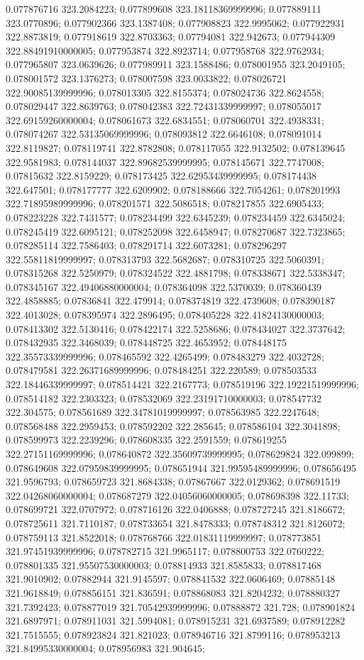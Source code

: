 0.077876716 323.2084223; 0.077899608 323.18118369999996; 0.077889111 323.0770896; 0.077902366 323.1387408; 0.077908823 322.9995062; 0.077922931 322.8873819; 0.077918619 322.8703363; 0.07794081 322.942673; 0.077944309 322.88491910000005; 0.077953874 322.8923714; 0.077958768 322.9762934; 0.077965807 323.0639626; 0.077989911 323.1588486; 0.078001955 323.2049105; 0.078001572 323.1376273; 0.078007598 323.0033822; 0.078026721 322.90085139999996; 0.078013305 322.8155374; 0.078024736 322.8624558; 0.078029447 322.8639763; 0.078042383 322.72431339999997; 0.078055017 322.69159260000004; 0.078061673 322.6834551; 0.078060701 322.4938331; 0.078074267 322.53135069999996; 0.078093812 322.6646108; 0.078091014 322.8119827; 0.078119741 322.8782808; 0.078117055 322.9132502; 0.078139645 322.9581983; 0.078144037 322.89682539999995; 0.078145671 322.7747008; 0.07815632 322.8159229; 0.078173425 322.62953439999995; 0.078174438 322.647501; 0.078177777 322.6209902; 0.078188666 322.7054261; 0.078201993 322.71895989999996; 0.078201571 322.5086518; 0.078217855 322.6905433; 0.078223228 322.7431577; 0.078234499 322.6345239; 0.078234459 322.6345024; 0.078245419 322.6095121; 0.078252098 322.6458947; 0.078270687 322.7323865; 0.078285114 322.7586403; 0.078291714 322.6073281; 0.078296297 322.55811819999997; 0.078313793 322.5682687; 0.078310725 322.5060391; 0.078315268 322.5250979; 0.078324522 322.4881798; 0.078338671 322.5338347; 0.078345167 322.49406880000004; 0.078364098 322.5370039; 0.078360439 322.4858885; 0.07836841 322.479914; 0.078374819 322.4739608; 0.078390187 322.4013028; 0.078395974 322.2896495; 0.078405228 322.41824130000003; 0.078413302 322.5130416; 0.078422174 322.5258686; 0.078434027 322.3737642; 0.078432935 322.3468039; 0.078448725 322.4653952; 0.078448175 322.35573339999996; 0.078465592 322.4265499; 0.078483279 322.4032728; 0.078479581 322.26371689999996; 0.078484251 322.220589; 0.078503533 322.18446339999997; 0.078514421 322.2167773; 0.078519196 322.19221519999996; 0.078514182 322.2303323; 0.078532069 322.23191710000003; 0.078547732 322.304575; 0.078561689 322.34781019999997; 0.078563985 322.2247648; 0.078568488 322.2959453; 0.078592202 322.285645; 0.078586104 322.3041898; 0.078599973 322.2239296; 0.078608335 322.2591559; 0.078619255 322.27151169999996; 0.078640872 322.35609739999995; 0.078629824 322.099899; 0.078649608 322.07959839999995; 0.078651944 321.99595489999996; 0.078656495 321.9596793; 0.078659723 321.8684338; 0.07867667 322.0129362; 0.078691519 322.04268060000004; 0.078687279 322.04056060000005; 0.078698398 322.11733; 0.078699721 322.0707972; 0.078716126 322.0406888; 0.078727245 321.8186672; 0.078725611 321.7110187; 0.078733654 321.8478333; 0.078748312 321.8126072; 0.078759113 321.8522018; 0.078768766 322.01831119999997; 0.078773851 321.97451939999996; 0.078782715 321.9965117; 0.078800753 322.0760222; 0.078801335 321.95507530000003; 0.078814933 321.8585833; 0.078817468 321.9010902; 0.07882944 321.9145597; 0.078841532 322.0606469; 0.07885148 321.9618849; 0.078856151 321.836591; 0.078868083 321.8204232; 0.078880327 321.7392423; 0.078877019 321.70542939999996; 0.07888872 321.728; 0.078901824 321.6897971; 0.078911031 321.5994081; 0.078915231 321.6937589; 0.078912282 321.7515555; 0.078923824 321.821023; 0.078946716 321.8799116; 0.078953213 321.84995330000004; 0.078956983 321.904645; 